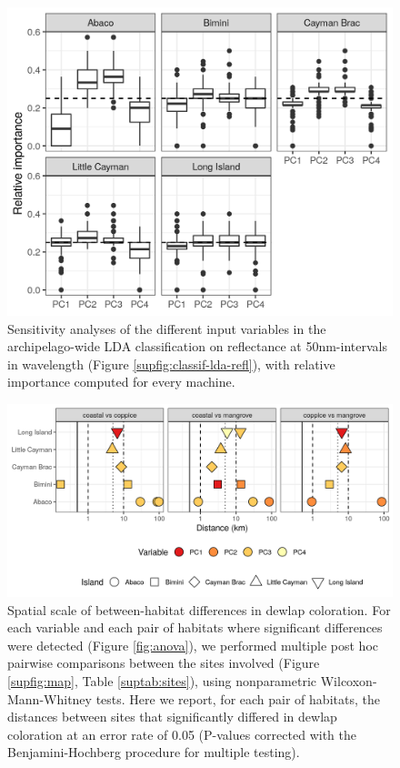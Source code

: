 \begin{figure}[H]
	\centering
	\includegraphics[width=\textwidth]{"../analyses/04-machine learning/plots/importance_lda_pca"}
	\caption{Sensitivity analyses of the different input variables in the archipelago-wide LDA classification on reflectance at 50nm-intervals in wavelength (Figure \ref{supfig:classif-lda-refl}), with relative importance computed for every machine.}
	\label{supfig:importance-lda-refl}
\end{figure}

\begin{figure}[H]
	\centering
	\includegraphics[width=\textwidth]{"../analyses/10-distances/figure_distances2"}
	\caption{Spatial scale of between-habitat differences in dewlap coloration. For each variable and each pair of habitats where significant differences were detected (Figure \ref{fig:anova}), we performed multiple post hoc pairwise comparisons between the sites involved (Figure \ref{supfig:map}, Table \ref{suptab:sites}), using nonparametric Wilcoxon-Mann-Whitney tests. Here we report, for each pair of habitats, the distances between sites that significantly differed in dewlap coloration at an error rate of 0.05 (P-values corrected with the Benjamini-Hochberg procedure for multiple testing).}
	\label{supfig:distances}
\end{figure}

